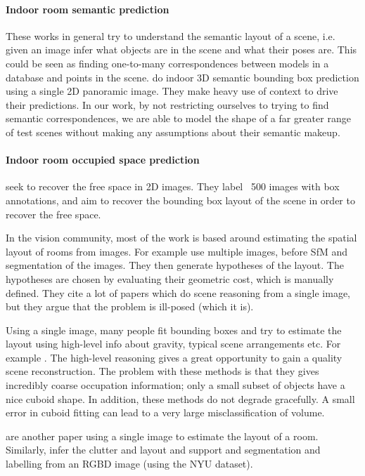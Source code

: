 \documentclass[10pt,twocolumn,letterpaper]{article}
\makeatletter
\renewcommand*{\ie}{i.e.\@\xspace}
\makeatother
\begin{document}
\paragraph{Indoor room semantic prediction}
These works in general try to understand the semantic layout of a scene, \ie given an image infer what objects are in the scene and what their poses are.
\cite{nan-acm-2012, minkim-siggraphasia-2012}
This could be seen as finding one-to-many correspondences between models in a database and points in the scene.
\cite{zhang-eccv-2014} do indoor 3D semantic bounding box prediction using a single 2D panoramic image. They make heavy use of context to drive their predictions.
In our work, by not restricting ourselves to trying to find semantic correspondences, we are able to model the shape of a far greater range of test scenes without making any assumptions about their semantic makeup.

\paragraph{Indoor room occupied space prediction}
\cite{hedau-cvpr-2012} seek to recover the free space in 2D images. They label ~500 images with box annotations, and aim to recover the bounding box layout of the scene in order to recover the free space.

In the vision community, most of the work is based around estimating the spatial layout of rooms from images.
For example \cite{bao-wacv-2014} use multiple images, before SfM and segmentation of the images. 
They then generate hypotheses of the layout. 
The hypotheses are chosen by evaluating their geometric cost, which is manually defined. 
They cite a lot of papers which do scene reasoning from a single image, but they argue that the problem is ill-posed (which it is). 

Using a single image, many people fit bounding boxes and try to estimate the layout using high-level info about gravity, typical scene arrangements etc. 
For example \cite{choi-cvpr-2013, shao-siggraphasia-2014}.
The high-level reasoning gives a great opportunity to gain a quality scene reconstruction.
The problem with these methods is that they gives incredibly coarse occupation information; only a small subset of objects have a nice cuboid shape.
In addition, these methods do not degrade gracefully.
A small error in cuboid fitting can lead to a very large misclassification of volume.

\cite{lee-nips-2010} are another paper using a single image to estimate the layout of a room. 
Similarly, \cite{zhang-iccv-2013} infer the clutter and layout and support and segmentation and labelling from an RGBD image (using the NYU dataset).
\end{document}
